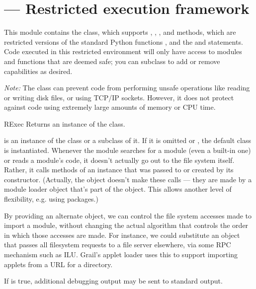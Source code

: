\section{ ---
         Restricted execution framework}




This module contains the  class, which supports
, , , and
 methods, which are restricted versions of the standard
Python functions ,  and
the  and  statements.
Code executed in this restricted environment will
only have access to modules and functions that are deemed safe; you
can subclass  to add or remove capabilities as desired.

\emph{Note:} The  class can prevent code from performing
unsafe operations like reading or writing disk files, or using TCP/IP
sockets.  However, it does not protect against code using extremely
large amounts of memory or CPU time.  

\begin{classdesc}{RExec}{}
Returns an instance of the  class.  

 is an instance of the  class or a subclass of it.
If it is omitted or , the default  class is
instantiated.
Whenever the  module searches for a module (even a
built-in one) or reads a module's code, it doesn't actually go out to
the file system itself.  Rather, it calls methods of an 
instance that was passed to or created by its constructor.  (Actually,
the  object doesn't make these calls --- they are made by
a module loader object that's part of the  object.  This
allows another level of flexibility, e.g. using packages.)

By providing an alternate  object, we can control the
file system accesses made to import a module, without changing the
actual algorithm that controls the order in which those accesses are
made.  For instance, we could substitute an  object that
passes all filesystem requests to a file server elsewhere, via some
RPC mechanism such as ILU.  Grail's applet loader uses this to support
importing applets from a URL for a directory.

If  is true, additional debugging output may be sent to
standard output.
\end{classdesc}

